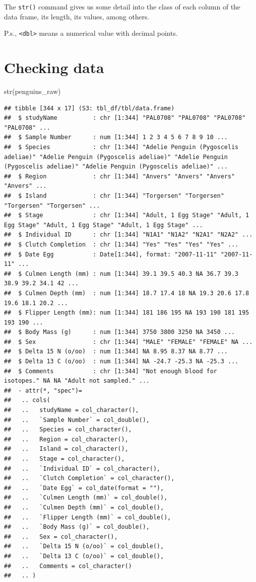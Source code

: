 \documentclass[
]{book}
\newenvironment{Shaded}{\begin{snugshade}}{\end{snugshade}}
\newcommand{\FunctionTok}[1]{\textcolor[rgb]{0.00,0.00,0.00}{#1}}
\newcommand{\NormalTok}[1]{#1}
\begin{document}
The \texttt{str()} command gives us some detail into the class of each column of the data frame, its length, its values, among others.

P.s., \texttt{\textless{}dbl\textgreater{}} means a numerical value with decimal points.

\hypertarget{checking-data}{%
\section{Checking data}\label{checking-data}}

\begin{Shaded}
\begin{Highlighting}[]
\FunctionTok{str}\NormalTok{(penguins\_raw)}
\end{Highlighting}
\end{Shaded}

\begin{verbatim}
## tibble [344 x 17] (S3: tbl_df/tbl/data.frame)
##  $ studyName          : chr [1:344] "PAL0708" "PAL0708" "PAL0708" "PAL0708" ...
##  $ Sample Number      : num [1:344] 1 2 3 4 5 6 7 8 9 10 ...
##  $ Species            : chr [1:344] "Adelie Penguin (Pygoscelis adeliae)" "Adelie Penguin (Pygoscelis adeliae)" "Adelie Penguin (Pygoscelis adeliae)" "Adelie Penguin (Pygoscelis adeliae)" ...
##  $ Region             : chr [1:344] "Anvers" "Anvers" "Anvers" "Anvers" ...
##  $ Island             : chr [1:344] "Torgersen" "Torgersen" "Torgersen" "Torgersen" ...
##  $ Stage              : chr [1:344] "Adult, 1 Egg Stage" "Adult, 1 Egg Stage" "Adult, 1 Egg Stage" "Adult, 1 Egg Stage" ...
##  $ Individual ID      : chr [1:344] "N1A1" "N1A2" "N2A1" "N2A2" ...
##  $ Clutch Completion  : chr [1:344] "Yes" "Yes" "Yes" "Yes" ...
##  $ Date Egg           : Date[1:344], format: "2007-11-11" "2007-11-11" ...
##  $ Culmen Length (mm) : num [1:344] 39.1 39.5 40.3 NA 36.7 39.3 38.9 39.2 34.1 42 ...
##  $ Culmen Depth (mm)  : num [1:344] 18.7 17.4 18 NA 19.3 20.6 17.8 19.6 18.1 20.2 ...
##  $ Flipper Length (mm): num [1:344] 181 186 195 NA 193 190 181 195 193 190 ...
##  $ Body Mass (g)      : num [1:344] 3750 3800 3250 NA 3450 ...
##  $ Sex                : chr [1:344] "MALE" "FEMALE" "FEMALE" NA ...
##  $ Delta 15 N (o/oo)  : num [1:344] NA 8.95 8.37 NA 8.77 ...
##  $ Delta 13 C (o/oo)  : num [1:344] NA -24.7 -25.3 NA -25.3 ...
##  $ Comments           : chr [1:344] "Not enough blood for isotopes." NA NA "Adult not sampled." ...
##  - attr(*, "spec")=
##   .. cols(
##   ..   studyName = col_character(),
##   ..   `Sample Number` = col_double(),
##   ..   Species = col_character(),
##   ..   Region = col_character(),
##   ..   Island = col_character(),
##   ..   Stage = col_character(),
##   ..   `Individual ID` = col_character(),
##   ..   `Clutch Completion` = col_character(),
##   ..   `Date Egg` = col_date(format = ""),
##   ..   `Culmen Length (mm)` = col_double(),
##   ..   `Culmen Depth (mm)` = col_double(),
##   ..   `Flipper Length (mm)` = col_double(),
##   ..   `Body Mass (g)` = col_double(),
##   ..   Sex = col_character(),
##   ..   `Delta 15 N (o/oo)` = col_double(),
##   ..   `Delta 13 C (o/oo)` = col_double(),
##   ..   Comments = col_character()
##   .. )
\end{verbatim}
\end{document}
